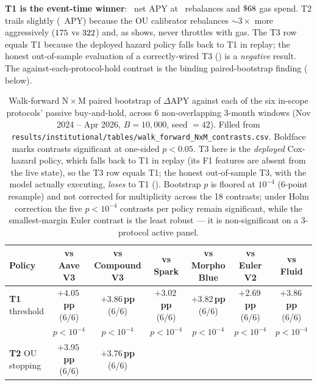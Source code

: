 \textbf{T1 is the event-time winner}: \TOneAPY\ net APY at
\TOneNRebal\ rebalances and $\TOneGasUSD$ gas spend.  T2 trails
slightly (\TTwoAPY\ APY) because the OU calibrator rebalances $\sim
3\times$ more aggressively ($\TTwoNRebal$ vs $\TOneNRebal$) and, as
 shows, never throttles with gas.  The T3 row
equals T1 because the deployed hazard policy falls back to T1 in
replay; the honest out-of-sample evaluation of a correctly-wired T3
() is a \emph{negative} result.  The
against-each-protocol-hold contrast is the binding paired-bootstrap
finding ( below).

\begin{table}[t]
  \centering
  \caption{Walk-forward N\,$\times$\,M paired bootstrap of $\Delta$APY
    against each of the six in-scope protocols' passive buy-and-hold,
    across $6$ non-overlapping 3-month windows
    (Nov 2024 -- Apr 2026, $B = 10{,}000$, seed $= 42$).  Filled from
    \texttt{results/institutional/tables/walk\_forward\_NxM\_contrasts.csv}.
    Boldface marks contrasts significant at one-sided $p<0.05$.
    T3 here is the \emph{deployed} Cox-hazard policy, which falls back
    to T1 in replay (its F1 features are absent from the live state), so
    the T3 row equals T1; the honest out-of-sample T3, with the model
    actually executing, \emph{loses} to T1 ().
    Bootstrap $p$ is floored at $10^{-4}$ (6-point resample) and not
    corrected for multiplicity across the 18 contrasts; under Holm
    correction the five $p<10^{-4}$ contrasts per policy remain
    significant, while the smallest-margin Euler contrast is the least
    robust --- it is non-significant on a 3-protocol active panel.}
  \label{tab:wf-nxm}
  \footnotesize
  \setlength{\tabcolsep}{4pt}
  \begin{tabular}{lcccccc}
    \toprule
    Policy & vs Aave V3 & vs Compound V3 & vs Spark & vs Morpho Blue & vs Euler V2 & vs Fluid \\
    \midrule
    \textbf{T1} threshold
      & \textbf{$+4.05$\,pp} (6/6)
      & \textbf{$+3.86$\,pp} (6/6)
      & \textbf{$+3.02$\,pp} (6/6)
      & \textbf{$+3.82$\,pp} (6/6)
      & \textbf{$+2.69$\,pp} (6/6)
      & \textbf{$+3.86$\,pp} (6/6) \\
      & $p < 10^{-4}$
      & $p < 10^{-4}$
      & $p < 10^{-4}$
      & $p < 10^{-4}$
      & $p < 10^{-4}$
      & $p < 10^{-4}$ \\
    \midrule
    \textbf{T2} OU stopping
      & \textbf{$+3.95$\,pp} (6/6)
      & \textbf{$+3.76$\,pp} (6/6)

\end{tabular}
\end{table}
